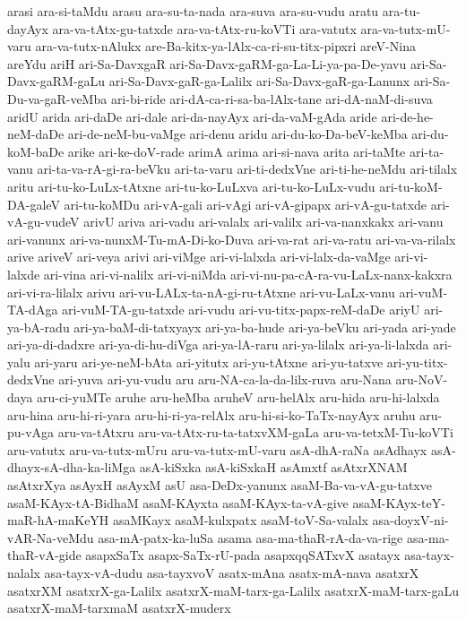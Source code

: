 {arasi
ara-si-taMdu
arasu
ara-su-ta-nada
ara-suva
ara-su-vudu
aratu
ara-tu-dayAyx
ara-va-tAtx-gu-tatxde
ara-va-tAtx-ru-koVTi
ara-vatutx
ara-va-tutx-mU-varu
ara-va-tutx-nAlukx
are-Ba-kitx-ya-lAlx-ca-ri-su-titx-pipxri
areV-Nina
areYdu
ariH
ari-Sa-DavxgaR
ari-Sa-Davx-gaRM-ga-La-Li-ya-pa-De-yavu
ari-Sa-Davx-gaRM-gaLu
ari-Sa-Davx-gaR-ga-Lalilx
ari-Sa-Davx-gaR-ga-Lanunx
ari-Sa-Du-va-gaR-veMba
ari-bi-ride
ari-dA-ca-ri-sa-ba-lAlx-tane
ari-dA-naM-di-suva
aridU
arida
ari-daDe
ari-dale
ari-da-nayAyx
ari-da-vaM-gAda
aride
ari-de-he-neM-daDe
ari-de-neM-bu-vaMge
ari-denu
aridu
ari-du-ko-Da-beV-keMba
ari-du-koM-baDe
arike
ari-ke-doV-rade
arimA
arima
ari-si-nava
arita
ari-taMte
ari-ta-vanu
ari-ta-va-rA-gi-ra-beVku
ari-ta-varu
ari-ti-dedxVne
ari-ti-he-neMdu
ari-tilalx
aritu
ari-tu-ko-LuLx-tAtxne
ari-tu-ko-LuLxva
ari-tu-ko-LuLx-vudu
ari-tu-koM-DA-galeV
ari-tu-koMDu
ari-vA-gali
ari-vAgi
ari-vA-gipapx
ari-vA-gu-tatxde
ari-vA-gu-vudeV
arivU
ariva
ari-vadu
ari-valalx
ari-valilx
ari-va-nanxkakx
ari-vanu
ari-vanunx
ari-va-nunxM-Tu-mA-Di-ko-Duva
ari-va-rat
ari-va-ratu
ari-va-va-rilalx
arive
ariveV
ari-veya
arivi
ari-viMge
ari-vi-lalxda
ari-vi-lalx-da-vaMge
ari-vi-lalxde
ari-vina
ari-vi-nalilx
ari-vi-niMda
ari-vi-nu-pa-cA-ra-vu-LaLx-nanx-kakxra
ari-vi-ra-lilalx
arivu
ari-vu-LALx-ta-nA-gi-ru-tAtxne
ari-vu-LaLx-vanu
ari-vuM-TA-dAga
ari-vuM-TA-gu-tatxde
ari-vudu
ari-vu-titx-papx-reM-daDe
ariyU
ari-ya-bA-radu
ari-ya-baM-di-tatxyayx
ari-ya-ba-hude
ari-ya-beVku
ari-yada
ari-yade
ari-ya-di-dadxre
ari-ya-di-hu-diVga
ari-ya-lA-raru
ari-ya-lilalx
ari-ya-li-lalxda
ari-yalu
ari-yaru
ari-ye-neM-bAta
ari-yitutx
ari-yu-tAtxne
ari-yu-tatxve
ari-yu-titx-dedxVne
ari-yuva
ari-yu-vudu
aru
aru-NA-ca-la-da-lilx-ruva
aru-Nana
aru-NoV-daya
aru-ci-yuMTe
aruhe
aru-heMba
aruheV
aru-helAlx
aru-hida
aru-hi-lalxda
aru-hina
aru-hi-ri-yara
aru-hi-ri-ya-relAlx
aru-hi-si-ko-TaTx-nayAyx
aruhu
aru-pu-vAga
aru-va-tAtxru
aru-va-tAtx-ru-ta-tatxvXM-gaLa
aru-va-tetxM-Tu-koVTi
aru-vatutx
aru-va-tutx-mUru
aru-va-tutx-mU-varu
asA-dhA-raNa
asAdhayx
asA-dhayx-sA-dha-ka-liMga
asA-kiSxka
asA-kiSxkaH
asAmxtf
asAtxrXNAM
asAtxrXya
asAyxH
asAyxM
asU
asa-DeDx-yanunx
asaM-Ba-va-vA-gu-tatxve
asaM-KAyx-tA-BidhaM
asaM-KAyxta
asaM-KAyx-ta-vA-give
asaM-KAyx-teY-maR-hA-maKeYH
asaMKayx
asaM-kulxpatx
asaM-toV-Sa-valalx
asa-doyxV-ni-vAR-Na-veMdu
asa-mA-patx-ka-luSa
asama
asa-ma-thaR-rA-da-va-rige
asa-ma-thaR-vA-gide
asapxSaTx
asapx-SaTx-rU-pada
asapxqqSATxvX
asatayx
asa-tayx-nalalx
asa-tayx-vA-dudu
asa-tayxvoV
asatx-mAna
asatx-mA-nava
asatxrX
asatxrXM
asatxrX-ga-Lalilx
asatxrX-maM-tarx-ga-Lalilx
asatxrX-maM-tarx-gaLu
asatxrX-maM-tarxmaM
asatxrX-muderx
}
